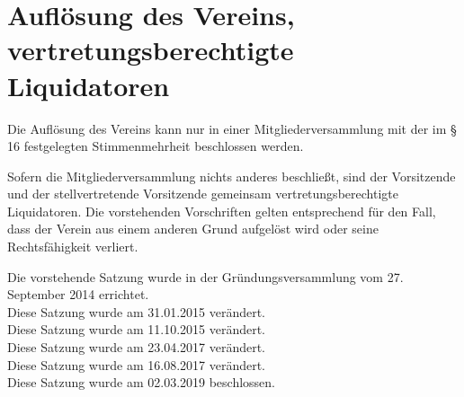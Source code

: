 \section{Auflösung des Vereins, vertretungsberechtigte Liquidatoren}
\begin{para}
	\item Die Auflösung des Vereins kann nur in einer Mitgliederversammlung mit der im § 16 festgelegten Stimmenmehrheit beschlossen werden. 
	\item Sofern die Mitgliederversammlung nichts anderes beschließt, sind der Vorsitzende und der stellvertretende Vorsitzende gemeinsam vertretungs\-be\-rech\-tigte Liquidatoren. 
	Die vorstehenden Vorschriften gelten entsprechend für den Fall, dass der Verein aus einem anderen Grund aufgelöst wird oder seine Rechtsfähigkeit verliert.
\end{para}

Die vorstehende Satzung wurde in der Gründungsversammlung vom 27. September 2014 errichtet. \\
Diese Satzung wurde am 31.01.2015 verändert. \\
Diese Satzung wurde am 11.10.2015 verändert. \\
Diese Satzung wurde am 23.04.2017 verändert. \\
Diese Satzung wurde am 16.08.2017 verändert. \\
Diese Satzung wurde am 02.03.2019 beschlossen. \\
